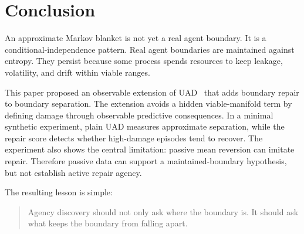 \documentclass[11pt]{article}
\begin{document}
\section{Conclusion}

An approximate Markov blanket is not yet a real agent boundary. It is a conditional-independence pattern. Real agent boundaries are maintained against entropy. They persist because some process spends resources to keep leakage, volatility, and drift within viable ranges.

This paper proposed an observable extension of UAD~\cite{uad2025,Tishby2000IB} that adds boundary repair to boundary separation. The extension avoids a hidden viable-manifold term by defining damage through observable predictive consequences. In a minimal synthetic experiment, plain UAD measures approximate separation, while the repair score detects whether high-damage episodes tend to recover. The experiment also shows the central limitation: passive mean reversion can imitate repair. Therefore passive data can support a maintained-boundary hypothesis, but not establish active repair agency.

The resulting lesson is simple:

\begin{quote}
Agency discovery should not only ask where the boundary is. It should ask what keeps the boundary from falling apart.
\end{quote}



\end{document}
